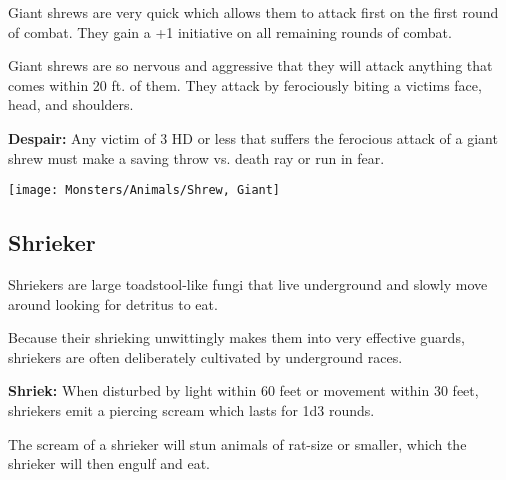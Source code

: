 \begin{multicols*}{2}
Giant shrews are very quick which allows them to attack first on the first round of combat. They gain a +1 initiative on all remaining rounds of combat.

Giant shrews are so nervous and aggressive that they will attack anything that comes within 20 ft. of them. They attack by ferociously biting a victims face, head, and shoulders.

\textbf{Despair:} Any victim of 3 HD or less that suffers the ferocious attack of a giant shrew must make a saving throw vs. death ray or run in fear.

\texttt{[image: Monsters/Animals/Shrew, Giant]}

\subsection{Shrieker}

Shriekers are large toadstool-like fungi that live underground and slowly move around looking for detritus to eat.

Because their shrieking unwittingly makes them into very effective guards, shriekers are often deliberately cultivated by underground races.

\textbf{Shriek:} When disturbed by light within 60 feet or movement within 30 feet, shriekers emit a piercing scream which lasts for 1d3 rounds.

The scream of a shrieker will stun animals of rat-size or smaller, which the shrieker will then engulf and eat.


\end{multicols*}
